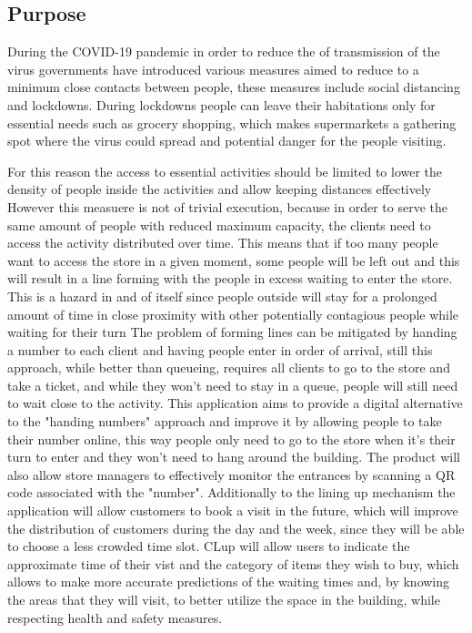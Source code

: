 
\subsection{Purpose}

During the COVID-19 pandemic in order to reduce the of transmission of the virus governments have introduced various measures aimed to reduce to a minimum close contacts between people, these measures include social distancing and lockdowns.
During lockdowns people can leave their habitations only for essential needs such as grocery shopping, which makes supermarkets a gathering spot where the virus could spread and potential danger for the people visiting.

For this reason the access to essential activities should be limited to lower the density of people inside the activities and allow keeping distances effectively
However this measuere is not of trivial execution, because in order to serve the same amount of people with reduced maximum capacity, the clients need to access the activity distributed over time. This means that if too many people want to access the store in a given moment, some people will be left out and this will result in a line forming with the people in excess waiting to enter the store.
This is a hazard in and of itself since people outside will stay for a prolonged amount of time in close proximity with other potentially contagious people while waiting for their turn
The problem of forming lines can be mitigated by handing a number to each client and having people enter in order of arrival, still this approach, while better than queueing, requires all clients to go to the store and take a ticket, and while they won't need to stay in a queue, people will still need to wait close to the activity. This application aims to provide a digital alternative to the "handing numbers" approach
and improve it by allowing people to take their number online, this way people only need to go to the store when it's their turn to enter and they won't need to hang around the building.
The product will also allow store managers to effectively monitor the entrances by scanning a QR code associated with the "number".
Additionally to the lining up mechanism the application will allow customers to book a visit in the future, which will improve the distribution of customers during the day and the week, since they will be able to choose a less crowded time slot.
CLup will allow users to indicate the approximate time of their vist and the category of items they wish to buy, which allows to make more accurate predictions of the waiting times and, by knowing the areas that they will visit, to better utilize the space in the building, while respecting health and safety measures.

